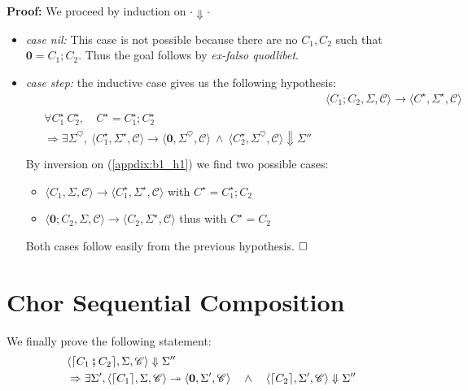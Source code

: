 \documentclass[12pt,a4paper,twoside]{book}
\newcommand{\qed}{\hfill\square}
\newcommand{\heart}{\heartsuit}
\begin{document}
\begin{appendices}
\noindent\textbf{Proof:}
We proceed by induction on $\cdot \Downarrow \cdot$
\begin{itemize}
\item \emph{case nil:} This case is not possible because there are no $C_1, C_2$ such that $\boldsymbol{0} = C_1; C_2$. Thus the goal follows by \emph{ex-falso quodlibet}.
\item \emph{case step:} the inductive case gives us the following hypothesis:
\begin{align}
&\langle C_1; C_2, \Sigma, \mathscr{C}\rangle \rightarrow
\langle C^\star, \Sigma^\star, \mathscr{C}\rangle \label{appdix:b1_h1} \tag{H1}\\
\begin{split}
&\forall C_1^\star~C_2^\star,\quad C^\star = C_1^\star; C_2^\star \\
&\Rightarrow \exists \Sigma^\heart,~\langle C_1^\star, \Sigma^\star, \mathscr{C}\rangle \rightarrow \langle \boldsymbol{0}, \Sigma^\heart, \mathscr{C}\rangle ~\land~ \langle C_2^\star, \Sigma^\heart, \mathscr{C}\rangle \Downarrow \Sigma'' \\
\end{split}\label{appdix:b1_ih}\tag{IH}
\end{align}
By inversion on (\ref{appdix:b1_h1}) we find two possible cases:
\begin{itemize}
\item $\langle C_1, \Sigma, \mathscr{C}\rangle \rightarrow
\langle C_1^\star, \Sigma^\star, \mathscr{C}\rangle$ with $C^\star = C_1^\star; C_2$
\item $\langle \boldsymbol{0}; C_2, \Sigma, \mathscr{C}\rangle \rightarrow
\langle C_2, \Sigma^\star, \mathscr{C}\rangle$ thus with $C^\star = C_2$
\end{itemize}
Both cases follow easily from the previous hypothesis. $\qed$
\end{itemize}


\section{\textbf{Chor} Sequential Composition}
We finally prove the following statement:
\begin{align}
\begin{split}
\label{appdix:Bfat}
&\langle \lceil C_1 \fatsemi C_2\rceil, \Sigma, \mathscr{C}\rangle \Downarrow \Sigma''\\
&\Rightarrow \exists \Sigma',
\langle \lceil C_1 \rceil, \Sigma, \mathscr{C} \rangle \twoheadrightarrow \langle \boldsymbol{0}, \Sigma', \mathscr{C} \rangle 
\quad\land\quad
\langle \lceil C_2 \rceil, \Sigma', \mathscr{C} \rangle \Downarrow \Sigma''
\end{split}
\end{align}


\end{appendices}
\end{document}
